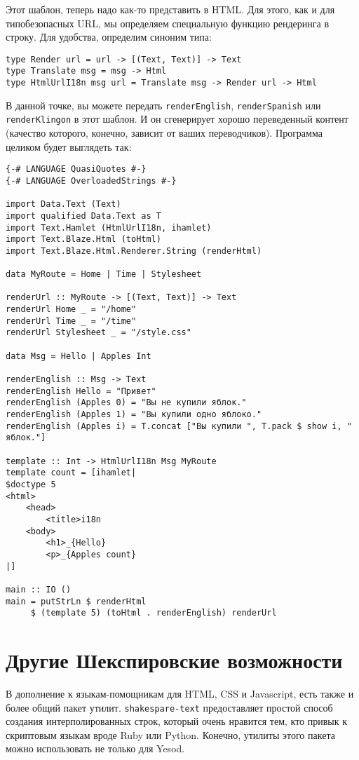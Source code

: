 Этот шаблон, теперь надо как-то представить в HTML.  Для этого, как и для типобезопасных URL, 
мы определяем специальную функцию рендеринга в строку.
Для удобства, определим синоним типа:

\begin{lstlisting}
type Render url = url -> [(Text, Text)] -> Text
type Translate msg = msg -> Html
type HtmlUrlI18n msg url = Translate msg -> Render url -> Html
\end{lstlisting}

В данной точке, вы можете передать \lstinline!renderEnglish!, 
\lstinline!renderSpanish! или \lstinline!renderKlingon! в этот шаблон. И он
сгенерирует хорошо переведенный контент (качество которого, конечно, зависит от
ваших переводчиков). Программа целиком будет выглядеть так:
\begin{lstlisting}
{-# LANGUAGE QuasiQuotes #-}
{-# LANGUAGE OverloadedStrings #-}

import Data.Text (Text)
import qualified Data.Text as T
import Text.Hamlet (HtmlUrlI18n, ihamlet)
import Text.Blaze.Html (toHtml)
import Text.Blaze.Html.Renderer.String (renderHtml)

data MyRoute = Home | Time | Stylesheet

renderUrl :: MyRoute -> [(Text, Text)] -> Text
renderUrl Home _ = "/home"
renderUrl Time _ = "/time"
renderUrl Stylesheet _ = "/style.css"

data Msg = Hello | Apples Int

renderEnglish :: Msg -> Text
renderEnglish Hello = "Привет"
renderEnglish (Apples 0) = "Вы не купили яблок."
renderEnglish (Apples 1) = "Вы купили одно яблоко."
renderEnglish (Apples i) = T.concat ["Вы купили ", T.pack $ show i, " яблок."]

template :: Int -> HtmlUrlI18n Msg MyRoute
template count = [ihamlet|
$doctype 5
<html>
    <head>
        <title>i18n
    <body>
        <h1>_{Hello}
        <p>_{Apples count}
|]

main :: IO ()
main = putStrLn $ renderHtml
     $ (template 5) (toHtml . renderEnglish) renderUrl
\end{lstlisting}

\section{Другие Шекспировские возможности}

В дополнение к языкам-помощникам для HTML, CSS и Javascript, есть также и более
общий пакет утилит. \lstinline!shakespare-text! предоставляет простой способ 
создания интерполированных строк, который очень нравится тем, кто привык к 
скриптовым языкам вроде Ruby или Python. Конечно, утилиты этого пакета можно
использовать не только для Yesod.

